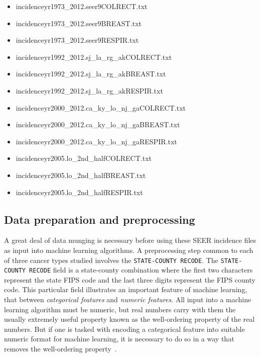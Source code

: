 \documentclass[a4paper,11pt]{article}
\newcommand{\code}[1]{\colorbox{light-gray}{\texttt{#1}}}
\begin{document}
\begin{itemize}[noitemsep]
\item incidenceyr1973\_2012.seer9COLRECT.txt
\item incidenceyr1973\_2012.seer9BREAST.txt
\item incidenceyr1973\_2012.seer9RESPIR.txt
\item incidenceyr1992\_2012.sj\_la\_rg\_akCOLRECT.txt
\item incidenceyr1992\_2012.sj\_la\_rg\_akBREAST.txt
\item incidenceyr1992\_2012.sj\_la\_rg\_akRESPIR.txt
\item incidenceyr2000\_2012.ca\_ky\_lo\_nj\_gaCOLRECT.txt
\item incidenceyr2000\_2012.ca\_ky\_lo\_nj\_gaBREAST.txt
\item incidenceyr2000\_2012.ca\_ky\_lo\_nj\_gaRESPIR.txt
\item incidenceyr2005.lo\_2nd\_halfCOLRECT.txt
\item incidenceyr2005.lo\_2nd\_halfBREAST.txt
\item incidenceyr2005.lo\_2nd\_halfRESPIR.txt
\end{itemize}



\subsection{Data preparation and preprocessing}
\label{subsec:dataprep}

A great deal of data munging is necessary before using these SEER incidence files as input into machine learning algorithms. A preprocessing step common to each of three cancer types studied involves the \code{STATE-COUNTY RECODE}.
The \code{STATE-COUNTY RECODE} field is a state-county combination where the first two characters represent the state FIPS code and the last three digits represent the FIPS county code.  
This particular field illustrates an important feature of machine learning, that between \textit{categorical features} and \textit{numeric features}. All input into a machine learning algorithm must be numeric, but real numbers carry with them the usually extremely useful property known as the well-ordering property of the real numbers. But if one is tasked with encoding a categorical feature into suitable numeric format for machine learning, it is necessary to do so in a way that removes the well-ordering property~\cite{bowles}. 
\end{document}
